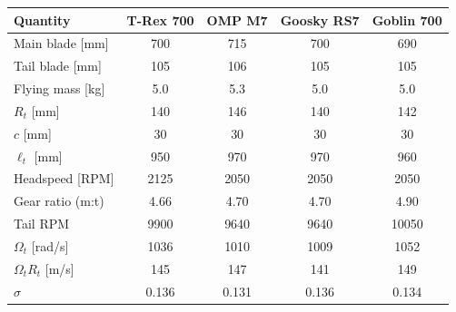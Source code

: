 \documentclass[11pt,a4paper]{article}
\newcommand{\OmegaT}{\Omega_t}
\newcommand{\Rt}{R_t}
\begin{document}
\begin{center}
\renewcommand{\arraystretch}{1.2}
\small
\begin{tabular}{lcccc}
\toprule
Quantity & T-Rex 700 & OMP M7 & Goosky RS7 & Goblin 700 \\
\midrule
Main blade [mm]       & 700   & 715   & 700   & 690   \\
Tail blade [mm]       & 105   & 106   & 105   & 105   \\
Flying mass [kg]      & 5.0   & 5.3   & 5.0   & 5.0   \\
\(\Rt\) [mm]          & 140   & 146   & 140   & 142   \\
\(c\) [mm]            & 30    & 30    & 30    & 30    \\
\(\ell_t\) [mm]       & 950   & 970   & 970   & 960   \\
Headspeed [RPM]       & 2125  & 2050  & 2050  & 2050  \\
Gear ratio (m:t)      & 4.66  & 4.70  & 4.70  & 4.90  \\
Tail RPM              & 9900  & 9640  & 9640  & 10050 \\
\(\OmegaT\) [rad/s]   & 1036  & 1010  & 1009  & 1052  \\
\(\OmegaT\Rt\) [m/s]  & 145   & 147   & 141   & 149   \\
\(\sigma\)            & 0.136 & 0.131 & 0.136 & 0.134 \\
\bottomrule
\end{tabular}
\end{center}
\end{document}
